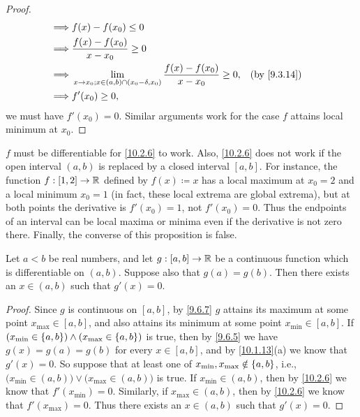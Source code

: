 \begin{proof}
\begin{align*}
    \implies & f(x) - f(x_0) \leq 0                                                                                             \\
    \implies & \dfrac{f(x) - f(x_0)}{x - x_0} \geq 0                                                                            \\
    \implies & \lim_{x \to x_0 ; x \in (a, b) \cap (x_0 - \delta, x_0)} \dfrac{f(x) - f(x_0)}{x - x_0} \geq 0, &  & \by{9.3.14} \\
    \implies & f'(x_0) \geq 0,
  \end{align*}
  we must have \(f'(x_0) = 0\).
  Similar arguments work for the case \(f\) attains local minimum at \(x_0\).
\end{proof}

\begin{note}
  \(f\) must be differentiable for \cref{10.2.6} to work.
  Also, \cref{10.2.6} does not work if the open interval \((a, b)\) is replaced by a closed interval \([a, b]\).
  For instance, the function \(f : [1, 2] \to \mathbb{R}\) defined by \(f(x) \coloneqq x\) has a local maximum at \(x_0 = 2\) and a local minimum \(x_0 = 1\) (in fact, these local extrema are global extrema), but at both points the derivative is \(f'(x_0) = 1\), not \(f'(x_0) = 0\).
  Thus the endpoints of an interval can be local maxima or minima even if the derivative is not zero there.
  Finally, the converse of this proposition is false.
\end{note}

\begin{thm}\label{10.2.7}
  Let \(a < b\) be real numbers, and let \(g : [a, b] \to \mathbb{R}\) be a continuous function which is differentiable on \((a, b)\).
  Suppose also that \(g(a) = g(b)\).
  Then there exists an \(x \in (a, b)\) such that \(g'(x) = 0\).
\end{thm}

\begin{proof}
  Since \(g\) is continuous on \([a, b]\), by \cref{9.6.7} \(g\) attains its maximum at some point \(x_{\max} \in [a, b]\), and also attains its minimum at some point \(x_{\min} \in [a, b]\).
  If \((x_{\min} \in \left\lbrace a, b\right\rbrace) \land (x_{\max} \in \left\lbrace a, b\right\rbrace)\) is true, then by \cref{9.6.5} we have \(g(x) = g(a) = g(b)\) for every \(x \in [a, b]\), and by \cref{10.1.13}(a) we know that \(g'(x) = 0\).
  So suppose that at least one of \(x_{\min}, x_{\max} \notin \left\lbrace a, b\right\rbrace\), i.e., \(\big(x_{\min} \in (a, b)\big) \lor \big(x_{\max} \in (a, b)\big)\) is true.
  If \(x_{\min} \in (a, b)\), then by \cref{10.2.6} we know that \(f'(x_{\min}) = 0\).
  Similarly, if \(x_{\max} \in (a, b)\), then by \cref{10.2.6} we know that \(f'(x_{\max}) = 0\).
  Thus there exists an \(x \in (a, b)\) such that \(g'(x) = 0\).
\end{proof}

